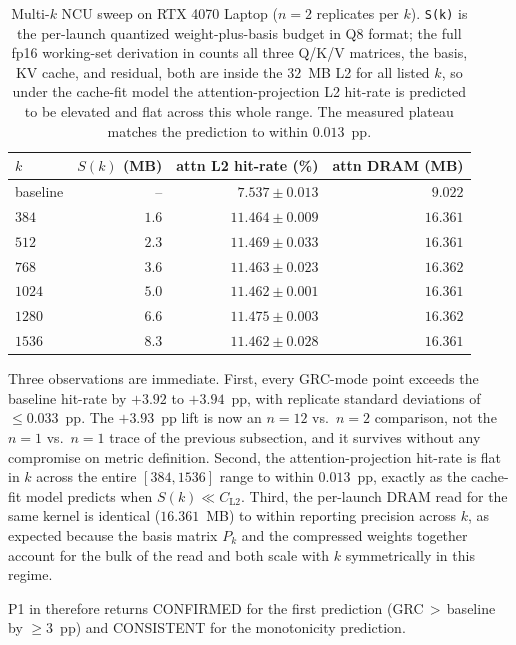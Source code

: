 \documentclass[11pt]{article}
\begin{document}
\begin{table}[h]\centering\footnotesize
\caption{Multi-$k$ NCU sweep on RTX 4070 Laptop ($n{=}2$ replicates per
$k$). \texttt{S(k)} is the per-launch quantized weight-plus-basis
budget in Q8 format; the full fp16 working-set derivation in
 counts all three Q/K/V matrices, the basis,
KV cache, and residual, both are inside the $32$~MB L2 for all listed
$k$, so under the cache-fit model the attention-projection L2 hit-rate
is predicted to be elevated and flat across this whole range. The
measured plateau matches the prediction to within $0.013$~pp.}
\label{tab:multi-k-ncu}
\begin{tabular}{lrrr}
\toprule
$k$ & $S(k)$ (MB) & attn L2 hit-rate (\%) & attn DRAM (MB) \\
\midrule
baseline   & --   & $7.537 \pm 0.013$ & $9.022$ \\
$384$      & $1.6$  & $11.464 \pm 0.009$ & $16.361$ \\
$512$      & $2.3$  & $11.469 \pm 0.033$ & $16.361$ \\
$768$      & $3.6$  & $11.463 \pm 0.023$ & $16.362$ \\
$1024$     & $5.0$  & $11.462 \pm 0.001$ & $16.361$ \\
$1280$     & $6.6$  & $11.475 \pm 0.003$ & $16.362$ \\
$1536$     & $8.3$  & $11.462 \pm 0.028$ & $16.361$ \\
\bottomrule
\end{tabular}
\end{table}

Three observations are immediate. First, every GRC-mode point exceeds
the baseline hit-rate by $+3.92$ to $+3.94$~pp, with replicate
standard deviations of $\le 0.033$~pp. The $+3.93$~pp lift is now an
$n{=}12$ vs.\ $n{=}2$ comparison, not the $n{=}1$ vs.\ $n{=}1$ trace
of the previous subsection, and it survives without any compromise on
metric definition. Second, the attention-projection hit-rate is flat
in $k$ across the entire $[384, 1536]$ range to within $0.013$~pp,
exactly as the cache-fit model predicts when $S(k)\ll C_\text{L2}$.
Third, the per-launch DRAM read for the same kernel is identical
($16.361$~MB) to within reporting precision across $k$, as expected
because the basis matrix $P_k$ and the compressed weights together
account for the bulk of the read and both scale with $k$ symmetrically
in this regime.

P1 in  therefore returns CONFIRMED for
the first prediction (GRC$\,>\,$baseline by $\ge 3$~pp) and
CONSISTENT for the monotonicity prediction.
\end{document}
